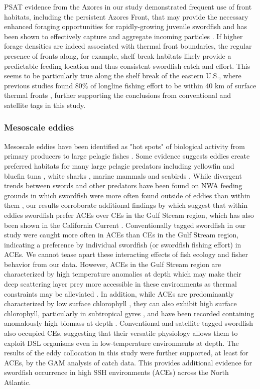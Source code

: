 PSAT evidence from the Azores in our study demonstrated frequent use of front habitats, including the persistent Azores Front, that may provide the necessary enhanced foraging opportunities for rapidly-growing juvenile swordfish and has been shown to effectively capture and aggregate incoming particles \citep{Sala2016}. If higher forage densities are indeed associated with thermal front boundaries, the regular presence of fronts along, for example, shelf break habitats likely provide a predictable feeding location and thus consistent swordfish catch and effort. This seems to be particularly true along the shelf break of the eastern U.S., where previous studies found 80\% of longline fishing effort to be within 40 km of surface thermal fronts \citep{Podesta1993}, further supporting the conclusions from conventional and satellite tags in this study.

\subsubsection{Mesoscale eddies}

Mesoscale eddies have been identified as "hot spots" of biological activity from primary producers \citep{McGillicuddy2007} to large pelagic fishes \citep{Hobday2014, Gaube2018}. Some evidence suggests eddies create preferred habitats for many large pelagic predators including yellowfin and bluefin tuna \citep{Teo2007, Hsu2015}, white sharks \citep{Gaube2018}, marine mammals \citep{Bailleul2010} and seabirds \citep{TewKai2009}. While divergent trends between swords and other predators have been found on NWA feeding grounds in which swordfish were more often found outside of eddies than within them \citep{Hsu2015}, our results corroborate additional findings by \citet{Hsu2015} which suggest that within eddies swordfish prefer ACEs over CEs in the Gulf Stream region, which has also been shown in the California Current \citep{Scales2017}. Conventionally tagged swordfish in our study were caught more often in ACEs than CEs in the Gulf Stream region, indicating a preference by individual swordfish (or swordfish fishing effort) in ACEs. We cannot tease apart these interacting effects of fish ecology and fisher behavior from our data. However, ACEs in the Gulf Stream region are characterized by high temperature anomalies at depth which may make their deep scattering layer prey more accessible in these environments as thermal constraints may be alleviated \citep{Gaube2018}. In addition, while ACEs are predominantly characterized by low surface chlorophyll \citep{Gaube2014}, they can also exhibit high surface chlorophyll, particularly in subtropical gyres \citep{Dufois2016}, and have been recorded containing anomalously high biomass at depth \citep{Fennell2015}. Conventional and satellite-tagged swordfish also occupied CEs, suggesting that their versatile physiology allows them to exploit DSL organisms even in low-temperature environments at depth. The results of the eddy collocation in this study were further supported, at least for ACEs, by the GAM analysis of catch data. This provides additional evidence for swordfish occurrence in high SSH environments (ACEs) across the North Atlantic.

